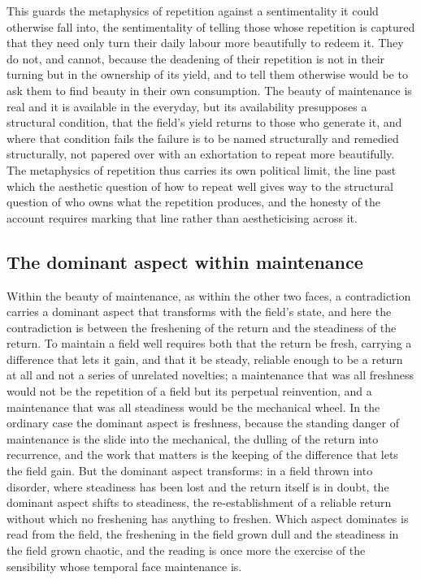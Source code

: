 This guards the metaphysics of repetition against a sentimentality it could otherwise fall into, the sentimentality of telling those whose repetition is captured that they need only turn their daily labour more beautifully to redeem it. They do not, and cannot, because the deadening of their repetition is not in their turning but in the ownership of its yield, and to tell them otherwise would be to ask them to find beauty in their own consumption. The beauty of maintenance is real and it is available in the everyday, but its availability presupposes a structural condition, that the field's yield returns to those who generate it, and where that condition fails the failure is to be named structurally and remedied structurally, not papered over with an exhortation to repeat more beautifully. The metaphysics of repetition thus carries its own political limit, the line past which the aesthetic question of how to repeat well gives way to the structural question of who owns what the repetition produces, and the honesty of the account requires marking that line rather than aestheticising across it.

\subsection{The dominant aspect within maintenance}
\label{p22:sub:maintenance-aspect}

Within the beauty of maintenance, as within the other two faces, a contradiction carries a dominant aspect that transforms with the field's state, and here the contradiction is between the freshening of the return and the steadiness of the return. To maintain a field well requires both that the return be fresh, carrying a difference that lets it gain, and that it be steady, reliable enough to be a return at all and not a series of unrelated novelties; a maintenance that was all freshness would not be the repetition of a field but its perpetual reinvention, and a maintenance that was all steadiness would be the mechanical wheel. In the ordinary case the dominant aspect is freshness, because the standing danger of maintenance is the slide into the mechanical, the dulling of the return into recurrence, and the work that matters is the keeping of the difference that lets the field gain. But the dominant aspect transforms: in a field thrown into disorder, where steadiness has been lost and the return itself is in doubt, the dominant aspect shifts to steadiness, the re-establishment of a reliable return without which no freshening has anything to freshen. Which aspect dominates is read from the field, the freshening in the field grown dull and the steadiness in the field grown chaotic, and the reading is once more the exercise of the sensibility whose temporal face maintenance is.

